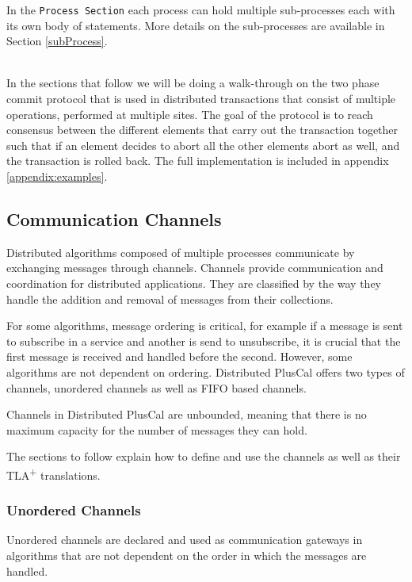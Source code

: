 \documentclass[journal]{IEEEtran}
\newcommand{\tlaplus}{TLA\textsuperscript{+}\xspace}
\begin{document}
In the \verb|Process Section| each process can hold multiple sub-processes each with its own body of statements. More details on the sub-processes are available in Section \ref{subProcess}.


\hfill\\
In the sections that follow we will be doing a walk-through on the two phase commit protocol that is used in distributed transactions that consist of multiple operations, performed at multiple sites. The goal of the protocol is to reach consensus between the different elements that carry out the transaction together such that if an element decides to abort all the other elements abort as well, and the transaction is rolled back. The full implementation is included in appendix \ref{appendix:examples}.

\FloatBarrier
\subsection{Communication Channels}
\label{comChannels}

Distributed algorithms composed of multiple processes communicate by exchanging messages through channels. Channels provide communication and coordination for distributed applications. They are classified by the way they handle the addition and removal of messages from their collections. 

For some algorithms, message ordering is critical, for example if a message is sent to subscribe in a service and another is send to unsubscribe, it is crucial that the first message is received and handled before the second. However, some algorithms are not dependent on ordering. Distributed PlusCal offers two types of channels, unordered channels as well as FIFO based channels.

Channels in Distributed PlusCal are unbounded, meaning that there is no maximum capacity for the number of messages they can hold.

The sections to follow explain how to define and use the channels as well as their \tlaplus translations. 

\subsubsection{Unordered Channels}

Unordered channels are declared and used as communication gateways in algorithms that are not dependent on the order in which the messages are handled.
\end{document}
